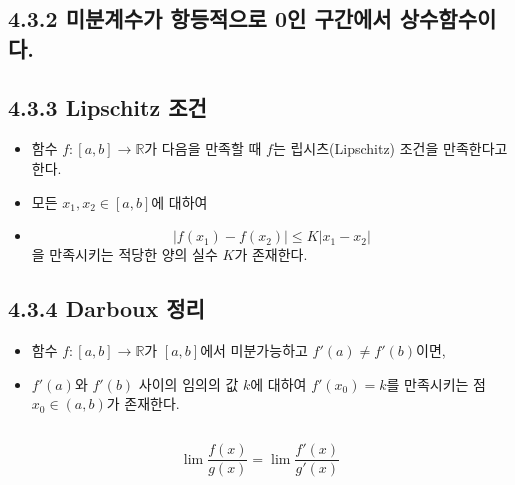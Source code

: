\documentclass{article}
\begin{document}
\subsection*{\textmd{4.3.2 미분계수가 항등적으로 0인 구간에서 상수함수이다.}}

\subsection*{\textmd{4.3.3 Lipschitz 조건}}
\begin{itemize}
    \item 함수 \( f:[a,b]\to \mathbb{R} \)가 다음을 만족할 때 \( f \)는 립시츠(Lipschitz) 조건을 만족한다고 한다.
    \item 모든 \( x_1,x_2 \in [a,b] \)에 대하여
    \item \[ |f(x_1)-f(x_2)| \leq K |x_1-x_2| \]을 만족시키는 적당한 양의 실수 \( K \)가 존재한다.
\end{itemize}

\subsection*{\textmd{4.3.4 Darboux 정리}}
\begin{itemize}
    \item 함수 \( f:[a,b]\to \mathbb{R} \)가 \([a,b]\)에서 미분가능하고 \( f'(a) \neq f'(b) \)이면,
    \item \( f'(a) \)와 \( f'(b) \) 사이의 임의의 값 \( k \)에 대하여 \( f'(x_0)=k \)를 만족시키는 점 \( x_0 \in (a,b) \)가 존재한다.
\end{itemize}

\subsection{\fontsize{11.5}{13}\selectfont{4.4.1 로피탈 법칙 (0/0꼴, \(\infty/\infty\)꼴 for 닫힌구간, 비유계 폐구간)}}

\[
\lim \frac{f(x)}{g(x)} = \lim \frac{f'(x)}{g'(x)}
\]


\subsection{\fontsize{11.5}{13}\selectfont{다항함수는 임의의 실수에 대응되는 함숫값을 쉽게 얻을 수 있는 장점을 가진 초등함수이다. 이러한 이유에서 다항함수는 어떤 다른 함수의 근사함수로 많이 이용되고 있는 것이다. 다항함수로의 근사가 가능한 함수를 해석함수라 부르며, 테일러 급수를 통해 근사가 이루어진다.}}
\end{document}
